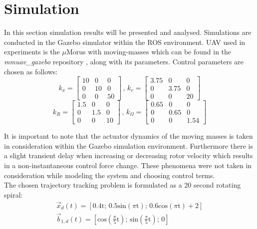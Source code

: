 \section{Simulation}
In this section simulation results will be presented and analysed. Simulations are conducted in the Gazebo simulator within the ROS environment. UAV used in experiments is the $\mu$Morus with moving-masses which can be found in the \textit{mmuav\_gazebo} repository \cite{gitLink}, along with its parameters. 
Control parameters are chosen as follows:
\begin{equation*}
	k_x = 
	\begin{bmatrix}
		10 &  0  &  0 \\
		 0 & 10  &	0 \\ 
		 0 &  0  & 50 	
	\end{bmatrix}
	\, , \,	
	k_v =
	\begin{bmatrix}
		3.75 & 0 & 0 \\
		0 & 3.75 & 0 \\
		0 & 0 & 20
	\end{bmatrix}
\end{equation*}
\begin{equation*}
	k_R = 
	\begin{bmatrix}
		1.5 & 0 & 0 \\
		0 & 1.5 & 0 \\
		0 & 0 & 10
	\end{bmatrix}
	\, , \,
	k_\Omega = 
	\begin{bmatrix}
		0.65 & 0 & 0 \\
		0 & 0.65 & 0 \\
		0 & 0 & 1.54
	\end{bmatrix}
\end{equation*}

It is important to note that the actuator dynamics of the moving masses is taken in consideration within the Gazebo simulation environment. Furthermore there is a slight transient delay when increasing or decreasing rotor velocity which results in a non-instantaneous control force change. These phenomena were not taken in consideration while modeling the system and choosing control terms. \\

The chosen trajectory tracking problem is formulated as a 20 second rotating spiral:
\begin{gather*}
	\vec{x}_d(t) = [0.4\text{t}; \, 0.5\text{sin}(\pi\text{t}); \, 0.6\text{cos}(\pi\text{t}) + 2] \\
	\vec{b}_{1,d}(t) = [\text{cos}\left(\frac{\pi}{5}\text{t}\right); \, \text{sin}\left(\frac{\pi}{5}\text{t}\right); \, 0]
\end{gather*}

